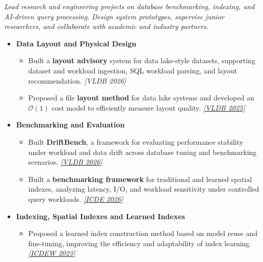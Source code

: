 \documentclass{resume}
\begin{document}

\textit{Lead research and engineering projects on database benchmarking, indexing, and AI-driven query processing.}
\textit{Design system prototypes, supervise junior researchers, and collaborate with academic and industry partners.}

\begin{itemize}[parsep=0.4ex]


\item \textbf{Data Layout and Physical Design}
\begin{itemize}[parsep=0.3ex]
    \item Built a \textbf{layout advisory} system for data lake-style datasets, supporting dataset and workload ingestion, SQL workload parsing, and layout recommendation.
    \href{https://github.com/Liuguanli/layout_advisor}{\faGithub}
    \textit{[VLDB 2026]}

    \item Proposed a file \textbf{layout method} for data lake systems and developed an \(\mathcal{O}(1)\) cost model to efficiently measure layout quality.
    \href{https://github.com/Liuguanli/LBMC}{\faGithub}
    \href{https://www.vldb.org/pvldb/vol17/p4773-liu.pdf}{\textit{[VLDB 2025\faExternalLink]}}
\end{itemize}

\item \textbf{Benchmarking and Evaluation}
\begin{itemize}[parsep=0.3ex]
    \item Built \textbf{DriftBench}, a framework for evaluating performance stability under workload and data drift across database tuning and benchmarking scenarios.
    \href{https://github.com/Liuguanli/DriftBench}{\faGithub}
    \href{https://arxiv.org/abs/2510.10858}{\textit{[VLDB 2026\faExternalLink]}}
    \item Built a \textbf{benchmarking framework} for traditional and learned spatial indexes, analyzing latency, I/O, and workload sensitivity under controlled query workloads. \href{https://github.com/Liuguanli/rl_spatial_benchmark}{\faGithub}
\href{https://arxiv.org/abs/2512.11161}{\textit{[ICDE 2026\faExternalLink]}}
\end{itemize}

\item \textbf{Indexing, Spatial Indexes and Learned Indexes}
\begin{itemize}[parsep=0.3ex]
    \item Proposed a learned index construction method based on model reuse and fine-tuning, improving the efficiency and adaptability of index learning.
\href{https://people.eng.unimelb.edu.au/jianzhongq/papers/DBML2023_ModelReuse.pdf}{\textit{[ICDEW 2023\faExternalLink]}}


\end{itemize}
\end{itemize}
\end{document}
